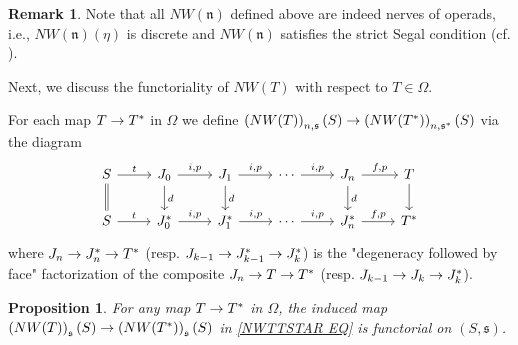 \documentclass[a4paper,10pt
,draft
]{article}%
\numberwithin{equation}{section}
\numberwithin{figure}{section}
\newtheorem{proposition}[equation]{Proposition}%
\theoremstyle{definition} %
\newtheorem{remark}[equation]{Remark}%
\newcommand{\1}{\ensuremath{\mathbbm 1}}%
\begin{document}
\begin{remark}
	Note that all
	$NW(\mathfrak{n})$ defined above are indeed nerves of operads,
	i.e., 
	$NW(\mathfrak{n})(\eta)$ is discrete
	and
	$NW(\mathfrak{n})$ satisfies the strict Segal condition
	(cf. \cite[Cor 3.69]{BP_geo}).
\end{remark}



Next, we discuss the functoriality of
$NW(T)$ with respect to $T \in \Omega$.

For each map $T \to T^{\**}$ in $\Omega$
we define
$\left(NW(T)\right)_{n,\mathfrak{s}}(S)
	\to 
\left(NW(T^{\**})\right)_{n,\mathfrak{s}^{\**}}(S)$
via the diagram
\begin{equation}\label{NWTTSTAR EQ}
\begin{tikzcd}
	S \ar{r}{t} \ar[equal]{d}
&
	J_0 \ar{r}{i,p} \ar{d}{d}
&
	J_1 \ar{r}{i,p} \ar{d}{d}
&
	\cdots \ar{r}{i,p}
&
	J_n \ar{r}{f,p} \ar{d}{d}
&
	T \ar{d}
\\
	S \ar{r}{t} 
&
	J^{\**}_0 \ar{r}{i,p}
&
	J^{\**}_1 \ar{r}{i,p}
&
	\cdots \ar{r}{i,p}
&
	J^{\**}_n \ar{r}{f,p}
&
	T^{\**}
\end{tikzcd}
\end{equation}
where
$J_n \to J^{\**}_n \to T^{\**}$
(resp. 
$J_{k-1} \to J^{\**}_{k-1} \to J^{\**}_k$)
is the "degeneracy followed by face"
factorization of the composite
$J_n \to T \to T^{\**}$
(resp.
$J_{k-1} \to J_{k} \to J^{\**}_k$).




\begin{proposition}
	For any map $T \to T^{\**}$ in $\Omega$, the induced map
	$\left(NW(T)\right)_{\mathfrak{s}}(S)
	\to 
	\left(NW(T^{\**})\right)_{\mathfrak{s}}(S)$
	in 
	\eqref{NWTTSTAR EQ}
	is functorial on $(S,\mathfrak{s})$.
\end{proposition}
\end{document}
